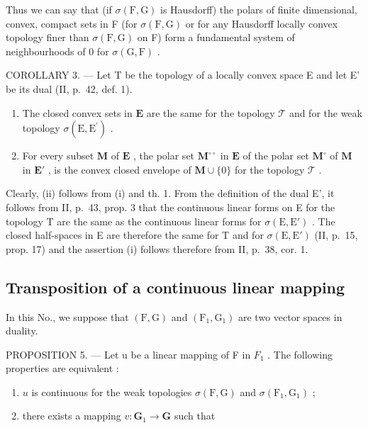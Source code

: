 Thus we can say that (if \(\sigma(\mathrm{F},\mathrm{G})\) is Hausdorff) the polars of finite dimensional, convex, compact sets in F (for \(\sigma(\mathrm{F},\mathrm{G})\) or for any Hausdorff locally convex topology finer than \(\sigma(\mathrm{F},\mathrm{G})\) on F) form a fundamental system of neighbourhoods of 0 for \(\sigma(\mathrm{G},\mathrm{F})\) .

COROLLARY 3. --- Let T be the topology of a locally convex space E and let E' be its dual (II, p.~42, def. 1).

\begin{enumerate}
\def\labelenumi{(\roman{enumi})}
\item
  The closed convex sets in \(\mathbf{E}\) are the same for the topology \(\mathcal{T}\) and for the weak topology \(\sigma (\mathrm{E},\mathrm{E}^{\prime})\) .
\item
  For every subset \(\mathbf{M}\) of \(\mathbf{E}\) , the polar set \(\mathbf{M}^{\circ \circ}\) in \(\mathbf{E}\) of the polar set \(\mathbf{M}^{\circ}\) of \(\mathbf{M}\) in \(\mathbf{E}'\) , is the convex closed envelope of \(\mathbf{M} \cup \{0\}\) for the topology \(\mathcal{T}\) .
\end{enumerate}

Clearly, (ii) follows from (i) and th. 1. From the definition of the dual E', it follows from II, p.~43, prop. 3 that the continuous linear forms on E for the topology T are the same as the continuous linear forms for \(\sigma(\mathrm{E}, \mathrm{E}')\) . The closed half-spaces in E are therefore the same for T and for \(\sigma(\mathrm{E}, \mathrm{E}')\) (II, p.~15, prop. 17) and the assertion (i) follows therefore from II, p.~38, cor. 1.

\subsection{Transposition of a continuous linear mapping}

In this No., we suppose that \((\mathrm{F},\mathrm{G})\) and \((\mathrm{F}_1,\mathrm{G}_1)\) are two vector spaces in duality.

PROPOSITION 5. --- Let u be a linear mapping of F in \(F_{1}\) . The following properties are equivalent :

\begin{enumerate}
\def\labelenumi{\alph{enumi})}
\item
  \(u\) is continuous for the weak topologies \(\sigma (\mathrm{F},\mathrm{G})\) and \(\sigma (\mathrm{F}_1,\mathrm{G}_1)\) ;
\item
  there exists a mapping \(v: \mathbf{G}_1 \to \mathbf{G}\) such that
\end{enumerate}

